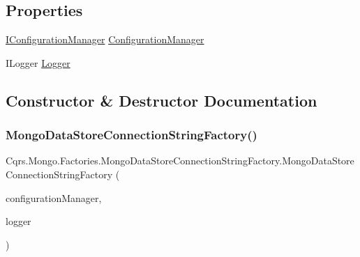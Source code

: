 \subsection*{Properties}
\begin{DoxyCompactItemize}
\item 
\hyperlink{interfaceCqrs_1_1Configuration_1_1IConfigurationManager}{I\+Configuration\+Manager} \hyperlink{classCqrs_1_1Mongo_1_1Factories_1_1MongoDataStoreConnectionStringFactory_a8bedb4433addd1adc1a20ee38893686d_a8bedb4433addd1adc1a20ee38893686d}{Configuration\+Manager}
\item 
I\+Logger \hyperlink{classCqrs_1_1Mongo_1_1Factories_1_1MongoDataStoreConnectionStringFactory_acc607022a5ff77a44aa7987cab70672a_acc607022a5ff77a44aa7987cab70672a}{Logger}
\end{DoxyCompactItemize}


\subsection{Constructor \& Destructor Documentation}
\mbox{\label{classCqrs_1_1Mongo_1_1Factories_1_1MongoDataStoreConnectionStringFactory_acad4a48959c7d40b5934663d1b71f414_acad4a48959c7d40b5934663d1b71f414}} 
\subsubsection{\texorpdfstring{Mongo\+Data\+Store\+Connection\+String\+Factory()}{MongoDataStoreConnectionStringFactory()}}
{\footnotesize\ttfamily Cqrs.\+Mongo.\+Factories.\+Mongo\+Data\+Store\+Connection\+String\+Factory.\+Mongo\+Data\+Store\+Connection\+String\+Factory (\begin{DoxyParamCaption}\item[{\hyperlink{interfaceCqrs_1_1Configuration_1_1IConfigurationManager}{I\+Configuration\+Manager}}]{configuration\+Manager,  }\item[{I\+Logger}]{logger }\end{DoxyParamCaption})}



